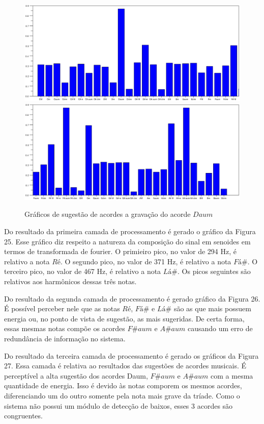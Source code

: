 \begin{figure}[h]
	\centering
		\includegraphics[keepaspectratio=true,scale=0.49]{figuras/Dm/acordes_1_Daum.eps}
		\includegraphics[keepaspectratio=true,scale=0.49]{figuras/Dm/acordes_2_Daum.eps}
	\caption{Gráficos de sugestão de acordes a gravação do acorde $Daum$}
\end{figure}
\newpage

Do resultado da primeira camada de processamento é gerado o gráfico da Figura 25. Esse gráfico diz respeito a natureza da composição do sinal em senoides em termos de transformada de fourier. O primieiro pico, no valor de 294 Hz, é relativo a nota $Ré$. O segundo pico, no valor de 371 Hz, é relativo a nota $Fá\#$. O terceiro pico, no valor de 467 Hz, é relativo a nota $Lá\#$. Os picos seguintes são relativos aos harmônicos dessas três notas. 

Do resultado da segunda camada de processamento é gerado gráfico da Figura 26. É possível perceber nele que as notas $Ré$, $Fá\#$ e $Lá\#$ são as que mais possuem energia ou, no ponto de vista de sugestão, as mais sugeridas. De certa forma, essas mesmas notas compõe os acordes $F\#aum$ e $A\#aum$ causando um erro de redundância de informação no sistema.  

Do resultado da terceira camada de processamento é gerado os gráficos da Figura 27. Essa camada é relativa ao resultados das sugestões de acordes musicais. É perceptível a alta sugestão dos acordes Daum, $F\#aum$ e $A\#aum$ com a mesma quantidade de energia. Isso é devido às notas comporem os mesmos acordes, diferenciando um do outro somente pela nota mais grave da tríade. Como o sistema não possui um módulo de detecção de baixos, esses 3 acordes são congruentes.



